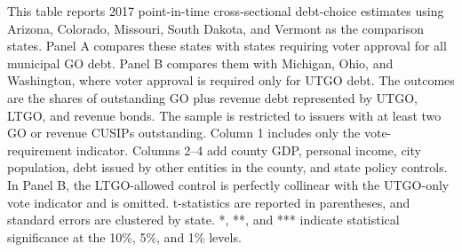 \newpage
\begin{table}[H]\centering
\caption{\textbf{Debt Choice: Alternative Comparison States}}
\label{tab:point_in_time_debt_choice_alternative_controls}
\parbox{\textwidth}{This table reports 2017 point-in-time cross-sectional debt-choice estimates using Arizona, Colorado, Missouri, South Dakota, and Vermont as the comparison states. Panel A compares these states with states requiring voter approval for all municipal GO debt. Panel B compares them with Michigan, Ohio, and Washington, where voter approval is required only for UTGO debt. The outcomes are the shares of outstanding GO plus revenue debt represented by UTGO, LTGO, and revenue bonds. The sample is restricted to issuers with at least two GO or revenue CUSIPs outstanding. Column 1 includes only the vote-requirement indicator. Columns 2--4 add county GDP, personal income, city population, debt issued by other entities in the county, and state policy controls. In Panel B, the LTGO-allowed control is perfectly collinear with the UTGO-only vote indicator and is omitted. t-statistics are reported in parentheses, and standard errors are clustered by state. *, **, and *** indicate statistical significance at the 10\%, 5\%, and 1\% levels.}
\end{table}

\vspace{10pt}

